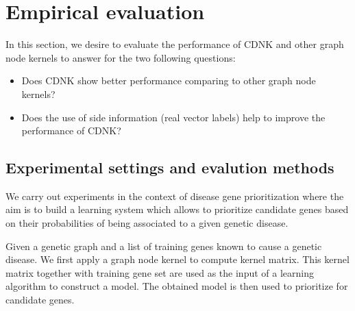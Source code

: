 \documentclass[review]{elsarticle}
\begin{document}
\section{Empirical evaluation}
\label{empirical-evaluation-cdnk}
In this section, we desire to evaluate the performance of CDNK and other graph node kernels to answer for the two following questions:
\begin{itemize}
\item Does CDNK show better performance comparing to other graph node kernels?
\item Does the use of side information (real vector labels) help to improve the performance of CDNK?
\end{itemize}

\subsection{Experimental settings and evalution methods}
We carry out experiments in the context of disease gene prioritization where the aim is to build a learning system which allows to prioritize candidate genes based on their probabilities of being associated to a given genetic disease.

 Given a genetic graph and a list of training genes known to cause a genetic disease. We first apply  a graph node kernel to compute kernel matrix. This kernel matrix together with training gene set are used as the input of a learning algorithm to construct a model. The obtained model is then used to prioritize for candidate genes.
\end{document}
